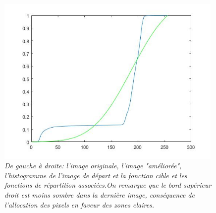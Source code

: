 \documentclass{article}
\begin{document}
\begin{figure}[!hbt]
\begin{minipage}{0.25\textwidth}
\end{minipage}%
\begin{minipage}{0.25\textwidth}
\centering
\includegraphics[width=0.98\textwidth]{images/p3_birds_cumsum.jpg}
\end{minipage}
\caption{\textit{De gauche à droite: l'image originale, l'image "améliorée", l'histogramme de l'image de départ et la fonction cible et les fonctions de répartition associées.On remarque que le bord supérieur droit est moins sombre dans la dernière image, conséquence de l'allocation des pixels en faveur des zones claires.}}
\label{fig:birds}
\end{figure}
\end{document}
